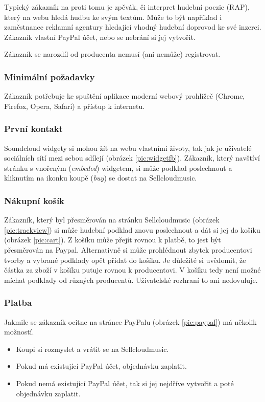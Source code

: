 \documentclass[12pt]{article}
\begin{document}
Typický zákazník na proti tomu je zpěvák, či interpret hudební poezie (RAP), který na webu hledá hudbu ke svým textům. Může to být například i zaměstnanec reklamní agentury hledající vhodný hudební doprovod ke své inzerci.
Zákazník vlastní PayPal účet, nebo se nebrání si jej vytvořit.

Zákazník se narozdíl od producenta nemusí (ani nemůže) registrovat.

\subsubsection{Minimální požadavky}
Zákazník potřebuje ke spuštění aplikace moderní webový prohlížeč (Chrome, Firefox, Opera, Safari) a přístup k internetu.

\subsubsection{První kontakt}
Soundcloud widgety si mohou žít na webu vlastními životy, tak jak je uživatelé sociálních sítí mezi sebou sdílejí (obrázek \ref{pic:widgetfb}). Zákazník, který navštíví stránku s vnořeným (\emph{embeded}) widgetem, si může podklad poslechnout a kliknutím na ikonku koupě (\emph{buy}) se dostat na Sellcloudmusic.

\subsubsection{Nákupní košík}
Zákazník, který byl přesměrován na stránku Sellcloudmusic (obrázek \ref{pic:trackview}) si může hudební podklad znovu poslechnout a dát si jej do košíku (obrázek \ref{pic:cart}). Z košíku může přejít rovnou k platbě, to jest být přesměrován na Paypal. Alternativně si může prohlédnout zbytek producentovi tvorby a vybrané podklady opět přidat do košíku.
Je důležité si uvědomit, že částka za zboží v košíku putuje rovnou k producentovi. V košíku tedy není možné míchat podklady od různých producentů. Uživatelské rozhraní to ani nedovuluje.

\subsubsection{Platba}
Jakmile se zákazník ocitne na stránce PayPalu (obrázek \ref{pic:paypal}) má několik možností.
\begin{itemize}
\item Koupi si rozmyslet a vrátit se na Sellcloudmusic.
\item Pokud má existující PayPal účet, objednávku zaplatit.
\item Pokud nemá existující PayPal účet, tak si jej nejdříve vytvořit a poté objednávku zaplatit.
\end{itemize}
\end{document}
